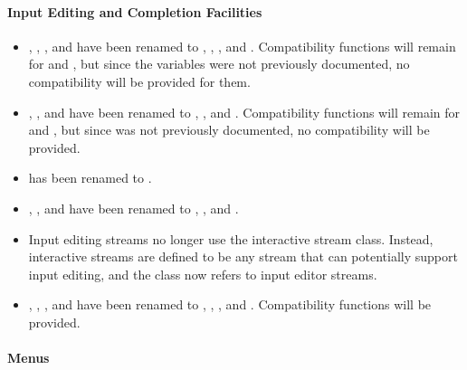 \paragraph {Input Editing and Completion Facilities}

\begin{itemize}
\item {}, ,
, and  have been
renamed to , ,
, and .  Compatibility
functions will remain for  and
, but since the variables were not previously
documented, no compatibility will be provided for them.

\item {}, , and
 have been renamed to ,
, and .  Compatibility
functions will remain for  and ,
but since  was not previously documented, no compatibility
will be provided.

\item {} has been renamed to .

\item {}, , and
 have been renamed to ,
, and .

\item Input editing streams no longer use the interactive stream class.
Instead, interactive streams are defined to be any stream that can potentially
support input editing, and the class  now refers to
input editor streams.

\item {}, , , and
 have been renamed to ,
, , and
.  Compatibility functions will be provided.
\end{itemize}


\paragraph {Menus}

